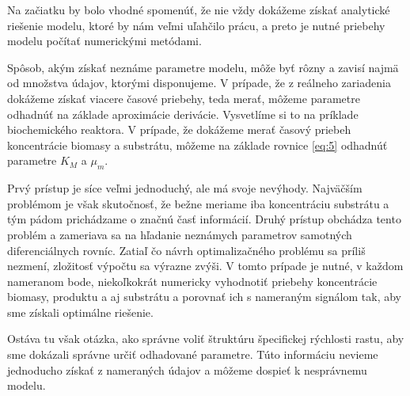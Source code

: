 Na začiatku by bolo vhodné spomenúť, že nie vždy dokážeme získať analytické riešenie modelu, ktoré by nám veľmi uľahčilo prácu, a preto je nutné priebehy modelu počítať numerickými metódami. 

Spôsob, akým získať neznáme parametre modelu, môže byť rôzny a zavisí najmä od množstva údajov, ktorými disponujeme. 
%
V prípade, že z reálneho zariadenia dokážeme získať viacere časové priebehy, teda merať, môžeme parametre odhadnúť na základe aproximácie derivácie. Vysvetlíme si to na príklade biochemického reaktora. V prípade, že dokážeme merať časový priebeh koncentrácie biomasy a substrátu, môžeme na základe rovnice \ref{eq:5} odhadnúť parametre $K_{M}$ a $\mu_{m}$.

Prvý prístup je síce veľmi jednoduchý, ale má svoje nevýhody. Najväčším problémom je však skutočnosť, že bežne meriame iba koncentráciu substrátu a tým pádom prichádzame o značnú časť informácií. Druhý prístup obchádza tento problém a zameriava sa na hľadanie neznámych parametrov samotných diferenciálnych rovníc. Zatiaľ čo návrh optimalizačného problému sa príliš nezmení, zložitosť výpočtu sa výrazne zvýši. V tomto prípade je nutné, v každom nameranom bode, niekoľkokrát numericky vyhodnotiť priebehy koncentrácie biomasy, produktu a aj substrátu a porovnať ich s nameraným signálom  tak, aby sme získali optimálne riešenie.

Ostáva tu však otázka, ako správne voliť štruktúru špecifickej rýchlosti rastu, aby sme dokázali správne určiť odhadované parametre. Túto informáciu nevieme jednoducho získať z nameraných údajov a môžeme dospieť k nesprávnemu modelu.
